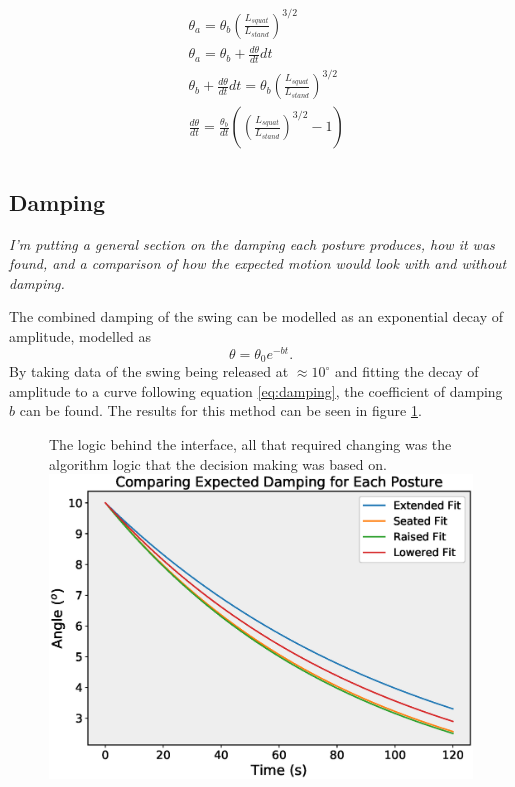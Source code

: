 \documentclass[11pt]{article}
\newcommand*\ruleline[1]{\par\noindent\raisebox{.8ex}{\makebox[\linewidth]{\hrulefill\hspace{1ex}\raisebox{-.8ex}{#1}\hspace{1ex}\hrulefill}}}
\begin{document}
\begin{align}
    &\theta_a = \theta_b (\frac{L_{squat}}{L_{stand}})^{3/2}\\
    &\theta_a = \theta_b + \frac{d\theta}{dt}dt\\
    &\theta_b + \frac{d\theta}{dt}dt = \theta_b (\frac{L_{squat}}{L_{stand}})^{3/2}\\
    &\frac{d\theta}{dt} = \frac{\theta_b}{dt} ((\frac{L_{squat}}{L_{stand}})^{3/2} - 1)\\ 
\end{align}


\subsection{Damping}
\ruleline{James Doering}
\textit{I'm putting a general section on the damping each posture produces, how it was found, and a comparison of how the expected motion would look with and without damping.}

The combined damping of the swing can be modelled as an exponential decay of amplitude, modelled as 
\begin{equation} \label{eq:damping}
    \theta = \theta_0 e^{-bt}.
\end{equation}
By taking data of the swing being released at $\approx 10^\circ$ and fitting the decay of amplitude to a curve following equation \ref{eq:damping}, the coefficient of damping $b$ can be found. The results for this method can be seen in figure \ref{fig:dampingpositions}.

    \begin{figure}[!htb]
        \centering
        \captionbox
             {The logic behind the interface, all that required changing was the algorithm logic that the decision making was based on.\label{fig:dampingpositions}}
             {\includegraphics[width=1.0\textwidth]{Damping Comparison.eps}}
    \end{figure}
\end{document}
